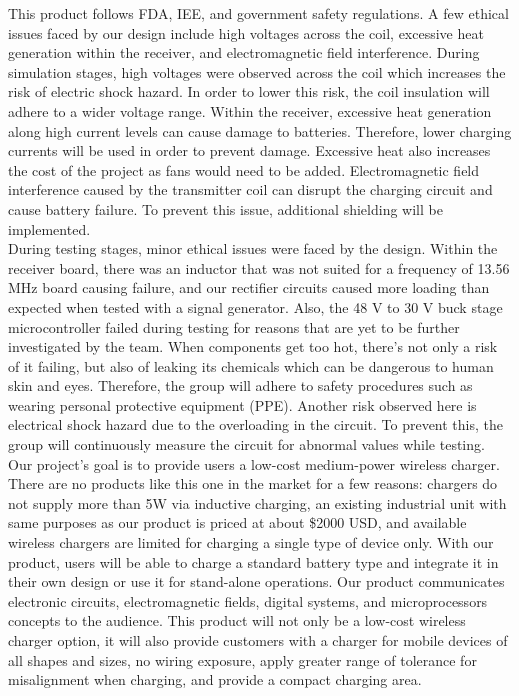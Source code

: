 \documentclass[12pt]{article}
\begin{document}
\indent \indent
This product follows FDA, IEE, and government safety regulations. A few ethical issues faced by our design include high voltages across the coil, excessive heat generation within the receiver, and electromagnetic field interference. During simulation stages, high voltages were observed across the coil which increases the risk of electric shock hazard. In order to lower this risk, the coil insulation will adhere to a wider voltage range. Within the receiver, excessive heat generation along high current levels can cause damage to batteries. Therefore, lower charging currents will be used in order to prevent damage. Excessive heat also increases the cost of the project as fans would need to be added. Electromagnetic field interference caused by the transmitter coil can disrupt the charging circuit and cause battery failure. To prevent this issue, additional shielding will be implemented. \\

\indent
During testing stages, minor ethical issues were faced by the design. Within the receiver board, there was an inductor that was not suited for a frequency of 13.56 MHz board causing failure, and our rectifier circuits caused more loading than expected when tested with a signal generator. Also, the 48 V to 30 V buck stage microcontroller failed during testing for reasons that are yet to be further investigated by the team. When components get too hot, there’s not only a risk of it failing, but also of leaking its chemicals which can be dangerous to human skin and eyes. Therefore, the group will adhere to safety procedures such as wearing personal protective equipment (PPE). Another risk observed here is electrical shock hazard due to the overloading in the circuit. To prevent this, the group will continuously measure the circuit for abnormal values while testing.\\

\indent
Our project’s goal is to provide users a low-cost medium-power wireless charger. There are no products like this one in the market for a few reasons: chargers do not supply more than 5W via inductive charging, an existing industrial unit with same purposes as our product is priced at about \$2000 USD, and available wireless chargers are limited for charging a single type of device only. With our product, users will be able to charge a standard battery type and integrate it in their own design or use it for stand-alone operations. Our product communicates electronic circuits, electromagnetic fields, digital systems, and microprocessors concepts to the audience. This product will not only be a low-cost wireless charger option, it will also provide customers with a charger for mobile devices of all shapes and sizes, no wiring exposure, apply greater range of tolerance for misalignment when charging, and provide a compact charging area. \\
\end{document}
